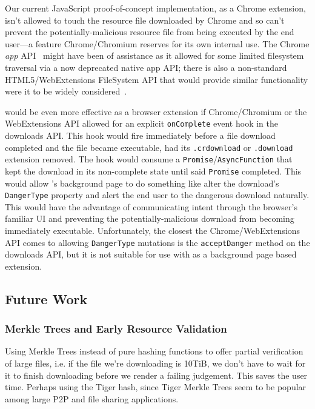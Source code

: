 Our current JavaScript proof-of-concept implementation, as a Chrome extension,
isn't allowed to touch the resource file downloaded by Chrome and so can't
prevent the potentially-malicious resource file from being executed by the end
user—a feature Chrome/Chromium reserves for its own internal use. The Chrome
\textit{app} API~\cite{AppAPI} might have been of assistance as it allowed for
some limited filesystem traversal via a now deprecated native app API; there is
also a non-standard HTML5/WebExtensions FileSystem API that would provide
similar functionality were it to be widely considered~\cite{deadSpec}.

\SYSTEM{} would be even more effective as a browser extension if Chrome/Chromium
or the WebExtensions API allowed for an explicit \texttt{onComplete} event hook
in the downloads API. This hook would fire immediately before a file download
completed and the file became executable, \ie had its \texttt{.crdownload} or
\texttt{.download} extension removed. The hook would consume a
\texttt{Promise}/\texttt{AsyncFunction} that kept the download in its
non-complete state until said \texttt{Promise} completed. This would allow
\SYSTEM{}'s background page to do something like alter the download's
\texttt{DangerType} property and alert the end user to the dangerous download
naturally. This would have the advantage of communicating intent through the
browser's familiar UI and preventing the potentially-malicious download from
becoming immediately executable. Unfortunately, the closest the
Chrome/WebExtensions API comes to allowing \texttt{DangerType} mutations is the
\texttt{acceptDanger} method on the downloads API, but it is not suitable for
use with \SYSTEM{} as a background page based extension.

\subsection{Future Work}

\subsubsection{Merkle Trees and Early Resource Validation}

Using Merkle Trees instead of pure hashing functions to offer partial
verification of large files, i.e. if the file we're downloading is 10TiB, we
don't have to wait for it to finish downloading before we render a failing
judgement. This saves the user time. Perhaps using the Tiger hash, since Tiger
Merkle Trees seem to be popular among large P2P and file sharing applications.


